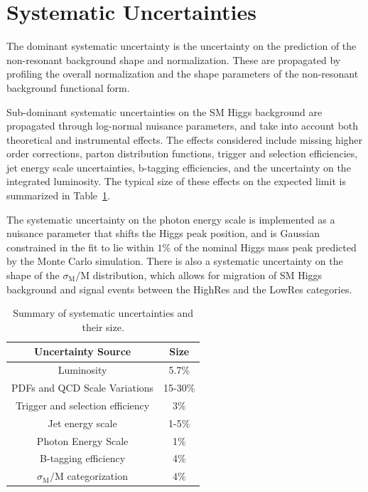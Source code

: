 \section{Systematic Uncertainties}\label{sec:systematics}
The dominant systematic uncertainty is the uncertainty on the prediction of the 
non-resonant background shape and normalization. These are propagated by
profiling the overall normalization and the shape parameters of the non-resonant
background functional form.

Sub-dominant systematic uncertainties on the SM Higgs background are propagated through
log-normal nuisance parameters, and take into account both theoretical and instrumental
effects. The effects considered include missing higher order corrections, 
parton distribution functions, trigger and selection efficiencies, jet energy scale uncertainties, 
b-tagging efficiencies, and the uncertainty on the integrated luminosity. The typical size of these 
effects on the expected limit is summarized in Table~\ref{tab:SignalSystematics}.

The systematic uncertainty on the photon energy scale is implemented as a nuisance parameter
that shifts the Higgs peak position, and is Gaussian constrained in the fit to lie within $1\%$ of the nominal 
Higgs mass peak predicted by the Monte Carlo simulation. There is also a systematic uncertainty 
on the shape of the $\sigma_{\mathrm{M}}/\mathrm{M}$ distribution, which allows for migration of 
SM Higgs background and signal events between the HighRes and the LowRes categories.

\begin{table}[!ht]
\begin{center}
\caption{Summary of systematic uncertainties and their size.}
\label{tab:SignalSystematics}
\begin{tabular}{|c|c|}
\hline
Uncertainty Source & Size \\
\hline
Luminosity                                 & 5.7\% \\
PDFs and QCD Scale Variations              & 15-30\%\\
Trigger and selection efficiency            & 3\% \\
Jet energy scale                           & 1-5\% \\
Photon Energy Scale                        & 1\% \\
B-tagging efficiency                       & 4\% \\
$\sigma_{\mathrm{M}}/\mathrm{M}$ categorization & $4\%$ \\
\hline
\end{tabular}
\end{center}
\end{table}



